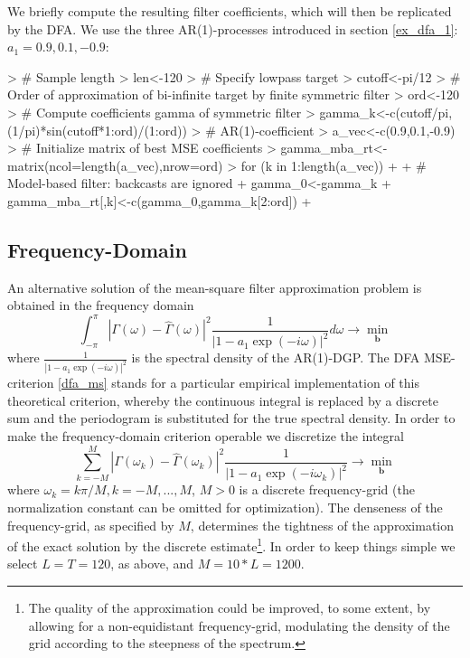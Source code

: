 \documentclass[a4paper]{book}
\begin{document}
We briefly compute the resulting filter coefficients, which will then be replicated by the DFA. We use the three AR(1)-processes introduced in section \ref{ex_dfa_1}: $a_1=0.9,0.1,-0.9$:
\begin{Schunk}
\begin{Sinput}
> # Sample length
> len<-120
> # Specify lowpass target
> cutoff<-pi/12
> # Order of approximation of bi-infinite target by finite symmetric filter
> ord<-120
> # Compute coefficients gamma of symmetric filter
> gamma_k<-c(cutoff/pi,(1/pi)*sin(cutoff*1:ord)/(1:ord))
> # AR(1)-coefficient
> a_vec<-c(0.9,0.1,-0.9)
> # Initialize matrix of best MSE coefficients
> gamma_mba_rt<-matrix(ncol=length(a_vec),nrow=ord)
> for (k in 1:length(a_vec))
+ {
+ # Model-based filter: backcasts are ignored
+   gamma_0<-gamma_k%
+   gamma_mba_rt[,k]<-c(gamma_0,gamma_k[2:ord])
+ }
\end{Sinput}
\end{Schunk}




\subsection{Frequency-Domain}

An alternative solution of the mean-square filter approximation problem is obtained in the frequency domain
\[
\int_{-\pi}^\pi |\Gamma(\omega)-\hat{\Gamma}(\omega)|^2\frac{1}{|1-a_1\exp(-i\omega)|^2}d\omega\to \min_{\mathbf{b}}\]
where $\displaystyle{\frac{1}{|1-a_1\exp(-i\omega)|^2}}$ is the spectral density of the AR(1)-DGP.
The DFA MSE-criterion \ref{dfa_ms} stands for a particular empirical implementation of this theoretical criterion, whereby the continuous integral is replaced by a discrete sum and the periodogram is substituted for the true spectral density. In order to make the frequency-domain criterion operable we discretize the integral 
\begin{equation}\label{mba_rep_by_dfa}
\sum_{k=-M}^M|\Gamma(\omega_k)-\hat{\Gamma}(\omega_k)|^2\frac{1}{|1-a_1\exp(-i\omega_k)|^2}\to \min_{\mathbf{b}}
\end{equation}
where $\omega_k=k\pi/M,k=-M,...,M$, $M>0$ is a  discrete frequency-grid (the normalization constant can be omitted for optimization). The denseness of the frequency-grid, as specified by $M$, determines the tightness of the approximation of the exact solution by the discrete estimate\footnote{The quality of the approximation could be improved, to some extent, by allowing for a non-equidistant frequency-grid, modulating the density of the grid according to the steepness of the spectrum.}. In order to keep things simple we select $L=T=120$, as above, and $M=10*L=1200$. 
\end{document}
